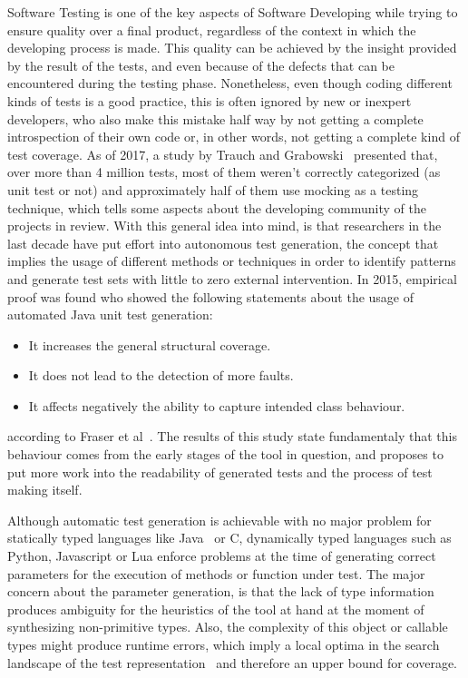 \documentclass[%
  chapterprefix=false,%
  open=right,%
  twoside=true,%
  paper=a4,%
  logofile={Figures/logo.png},%
  thesistype=master,%
  UKenglish,%
]{se2thesis}
\begin{document}
Software Testing is one of the key aspects of Software Developing while trying to ensure quality over a final product, regardless of the context in which the developing process is made.
This quality can be achieved by the insight provided by the result of the tests, and even because of the defects that can be encountered during the testing phase.
Nonetheless, even though coding different kinds of tests is a good practice, this is often ignored by new or inexpert developers, who also make this mistake half way by not getting a complete introspection   of their own code or, in other words, not getting a complete kind of test coverage.
As of 2017, a study by Trauch and Grabowski~\cite{DBLP:conf/icst/TrautschG17} presented that, over more than 4 million tests, most of them weren't correctly categorized (as unit test or not) and approximately half of them use mocking as a testing technique, which tells some aspects about the developing community of the projects in review. 
With this general idea into mind, is that researchers in the last decade   have put effort into autonomous test generation, the concept that implies the usage of different methods or techniques in order to identify patterns and generate test sets with little to zero   external intervention.
In 2015, empirical proof was found who showed the following statements about the usage of automated Java unit test generation:
\begin{itemize}
  \item It increases the general structural coverage.
  \item It does not lead to the detection of more faults.
  \item It affects negatively the ability to capture intended class behaviour.
\end{itemize}
according to Fraser et al~\cite{DBLP:journals/tosem/FraserSMAP15}.
The results of this study state fundamentaly that this behaviour  comes from the early stages of the tool in question, and proposes to put more work into the readability of generated tests and  the process of test making itself.

Although automatic test generation is achievable with no major problem for statically typed languages like Java~\cite{DBLP:journals/tse/FraserA13} or C, dynamically typed languages such as Python, Javascript or Lua enforce problems at the time of generating correct parameters for the execution of methods or function under test.
The major concern about the parameter generation, is that the lack of type information produces ambiguity for the heuristics of the tool at hand at the moment of synthesizing non-primitive types.
Also, the complexity of this object or callable types might produce runtime errors, which imply a local optima in the search landscape of the test representation~\cite{DBLP:conf/sigsoft/0001O00D21} and therefore an upper bound for coverage.
\end{document}
